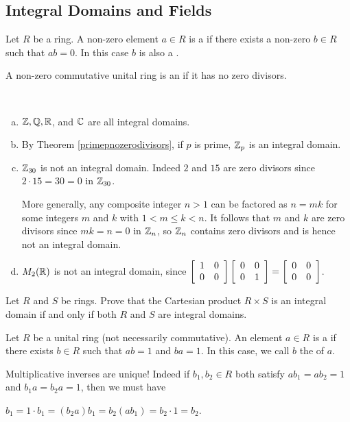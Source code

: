 \documentclass[11pt,fleqn,dvipsnames,usenames]{article}
\newcommand{\p}{\noindent}
\begin{document}
\subsection{Integral Domains and Fields}
%
\begin{definition}
Let $R$ be a ring.  A non-zero element $a\in R$ is a  if there exists a non-zero $b\in R$ such that $ab = 0$.  In this case $b$ is also a .
\end{definition}
%
\begin{definition}
A non-zero commutative unital ring is an  if it has no zero divisors.
\end{definition}
%
\begin{examples}~
\begin{enumerate}[(a)]
\item $\Z, \RATIONAL, \REAL$, and $\COMPLEX$ are all integral domains.
\item By Theorem \ref{primepnozerodivisors}, if $p$ is prime, $\Z_p$ is an integral domain.
\item $\Z_{30}$ is not an integral domain.  Indeed $2$ and $15$ are zero divisors since $2\cdot 15 = 30 = 0$ in $\Z_{30}$.
\vsmsp

\p More generally, any composite integer $n>1$ can be factored as $n = mk$ for some integers $m$ and $k$ with $1 < m\leq k < n$.  It follows that $m$ and $k$ are zero divisors since $mk = n = 0$ in $\ZN$, so $\ZN$ contains zero divisors and is hence not an integral domain.
\item $M_{2}(\REAL)$ is not an integral domain, since $\MATRIX{rr}{1 & 0\\0 & 0}\MATRIX{rr}{0 & 0\\0 & 1} = \MATRIX{rr}{0 & 0\\0 & 0}$.
\end{enumerate}
\end{examples}
%
\begin{exercise}
Let $R$ and $S$ be rings.  Prove that the Cartesian product $R\times S$ is an integral domain if and only if both $R$ and $S$ are integral domains.
\end{exercise}
%
\begin{definition}
Let $R$ be a unital ring (not necessarily commutative).  An element $a\in R$ is a  if there exists $b\in R$ such that $ab = 1$ and $ba = 1$.  In this case, we call $b$ the  of $a$.
\end{definition}
%
\begin{remark}
Multiplicative inverses are unique!  Indeed if $b_{1},b_{2}\in R$ both satisfy $ab_{1} = ab_{2} = 1$ and $b_{1}a = b_{2}a = 1$, then we must have
\begin{center}
$b_1 = 1\cdot b_1 = (b_2a)b_1 = b_2(ab_1) = b_2\cdot 1 = b_2$.
\end{center}
\end{remark}
\end{document}
